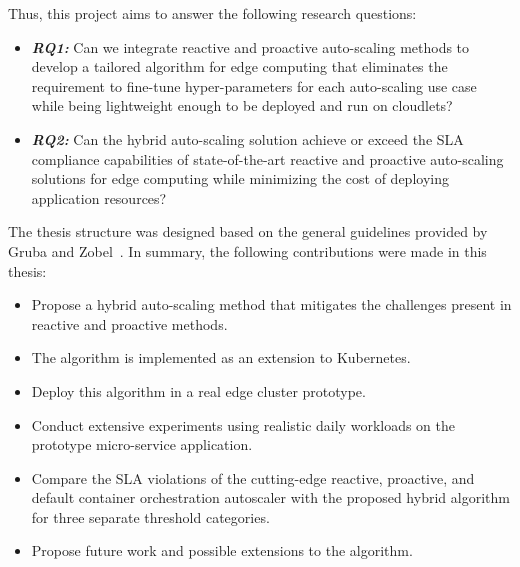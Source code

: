 Thus, this project aims to answer the following research questions:

\begin{itemize}
    \item \textbf{\textit{RQ1:}} Can we integrate reactive and proactive auto-scaling methods to develop a tailored algorithm for edge computing that eliminates the requirement to fine-tune hyper-parameters for each auto-scaling use case while being lightweight enough to be deployed and run on cloudlets?
    \item \textbf{\textit{RQ2:}} Can the hybrid auto-scaling solution achieve or exceed the SLA compliance capabilities of state-of-the-art reactive and proactive auto-scaling solutions for edge computing while minimizing the cost of deploying application resources?
\end{itemize}

The thesis structure was designed based on the general guidelines provided by Gruba and Zobel~\cite{gruba2017write}. In summary, the following contributions were made in this thesis:

\begin{itemize}
    \item Propose a hybrid auto-scaling method that mitigates the challenges present in reactive and proactive methods.
    \item The algorithm is implemented as an extension to Kubernetes.
    \item Deploy this algorithm in a real edge cluster prototype.
    \item Conduct extensive experiments using realistic daily workloads on the prototype micro-service application.
    \item Compare the SLA violations of the cutting-edge reactive, proactive, and default container orchestration autoscaler with the proposed hybrid algorithm for three separate threshold categories.
    \item Propose future work and possible extensions to the algorithm.
\end{itemize}
